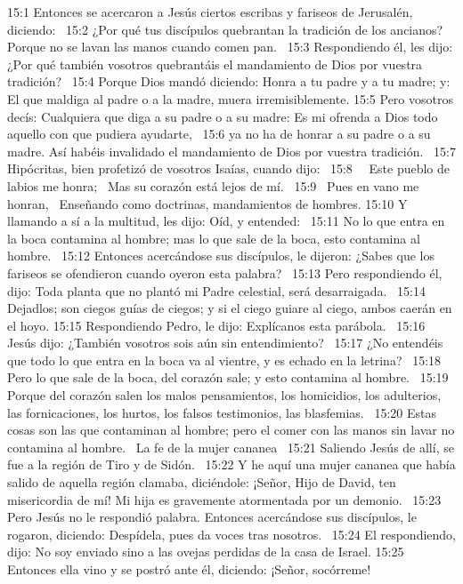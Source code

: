 15:1 Entonces se acercaron a Jesús ciertos escribas y fariseos de Jerusalén, diciendo:  
15:2 ¿Por qué tus discípulos quebrantan la tradición de los ancianos? Porque no se lavan las manos cuando comen pan.  
15:3 Respondiendo él, les dijo: ¿Por qué también vosotros quebrantáis el mandamiento de Dios por vuestra tradición?  
15:4 Porque Dios mandó diciendo: Honra a tu padre y a tu madre; y: El que maldiga al padre o a la madre, muera irremisiblemente. 
15:5 Pero vosotros decís: Cualquiera que diga a su padre o a su madre: Es mi ofrenda a Dios todo aquello con que pudiera ayudarte,  
15:6 ya no ha de honrar a su padre o a su madre. Así habéis invalidado el mandamiento de Dios por vuestra tradición.  
15:7 Hipócritas, bien profetizó de vosotros Isaías, cuando dijo:  
15:8   Este pueblo de labios me honra;  
Mas su corazón está lejos de mí.  
15:9  Pues en vano me honran,  
Enseñando como doctrinas, mandamientos de hombres. 
15:10 Y llamando a sí a la multitud, les dijo: Oíd, y entended:  
15:11 No lo que entra en la boca contamina al hombre; mas lo que sale de la boca, esto contamina al hombre.  
15:12 Entonces acercándose sus discípulos, le dijeron: ¿Sabes que los fariseos se ofendieron cuando oyeron esta palabra?  
15:13 Pero respondiendo él, dijo: Toda planta que no plantó mi Padre celestial, será desarraigada.  
15:14 Dejadlos; son ciegos guías de ciegos; y si el ciego guiare al ciego, ambos caerán en el hoyo. 
15:15 Respondiendo Pedro, le dijo: Explícanos esta parábola.  
15:16 Jesús dijo: ¿También vosotros sois aún sin entendimiento?  
15:17 ¿No entendéis que todo lo que entra en la boca va al vientre, y es echado en la letrina?  
15:18 Pero lo que sale de la boca, del corazón sale; y esto contamina al hombre.  
15:19 Porque del corazón salen los malos pensamientos, los homicidios, los adulterios, las fornicaciones, los hurtos, los falsos testimonios, las blasfemias.  
15:20 Estas cosas son las que contaminan al hombre; pero el comer con las manos sin lavar no contamina al hombre.  
La fe de la mujer cananea   
15:21 Saliendo Jesús de allí, se fue a la región de Tiro y de Sidón.  
15:22 Y he aquí una mujer cananea que había salido de aquella región clamaba, diciéndole: ¡Señor, Hijo de David, ten misericordia de mí! Mi hija es gravemente atormentada por un demonio.  
15:23 Pero Jesús no le respondió palabra. Entonces acercándose sus discípulos, le rogaron, diciendo: Despídela, pues da voces tras nosotros.  
15:24 El respondiendo, dijo: No soy enviado sino a las ovejas perdidas de la casa de Israel. 
15:25 Entonces ella vino y se postró ante él, diciendo: ¡Señor, socórreme!  
